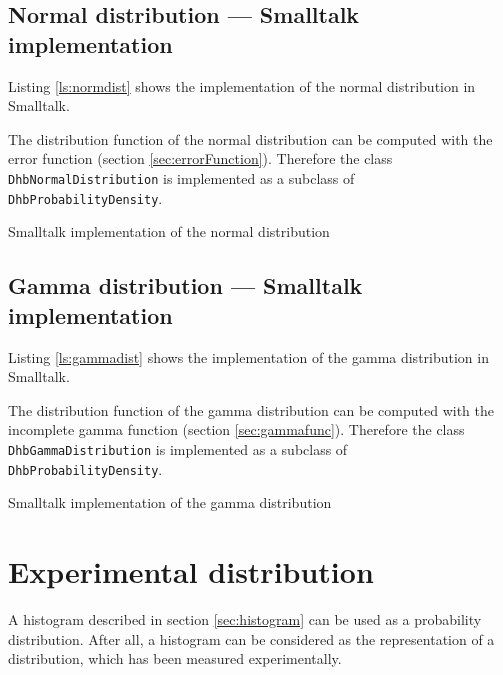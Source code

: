 \documentclass[twoside]{book}
\begin{document}
\subsection{Normal distribution --- Smalltalk implementation}
 Listing \ref{ls:normdist} shows the
implementation of the normal distribution in Smalltalk.

The distribution function of the normal distribution can be
computed with the error function (\cf section
\ref{sec:errorFunction}). Therefore the class {\tt
DhbNormalDistribution} is implemented as a subclass of {\tt
DhbProbabilityDensity}.

\begin{listing} Smalltalk implementation of the normal distribution \label{ls:normdist}

\end{listing}


\subsection{Gamma distribution --- Smalltalk implementation}
\label{sec:sgammadist}  Listing \ref{ls:gammadist} shows the implementation of
the gamma distribution in Smalltalk.

The distribution function of the gamma distribution can be
computed with the incomplete gamma function (\cf section
\ref{sec:gammafunc}). Therefore the class {\tt
DhbGammaDistribution} is implemented as a subclass of {\tt
DhbProbabilityDensity}.
\begin{listing} Smalltalk implementation of the gamma distribution \label{ls:gammadist}

\end{listing}


\section{Experimental distribution}
A histogram described in section \ref{sec:histogram} can be used
as a probability distribution. After all, a histogram can be
considered as the representation of a distribution, which has been
measured experimentally.
\end{document}
